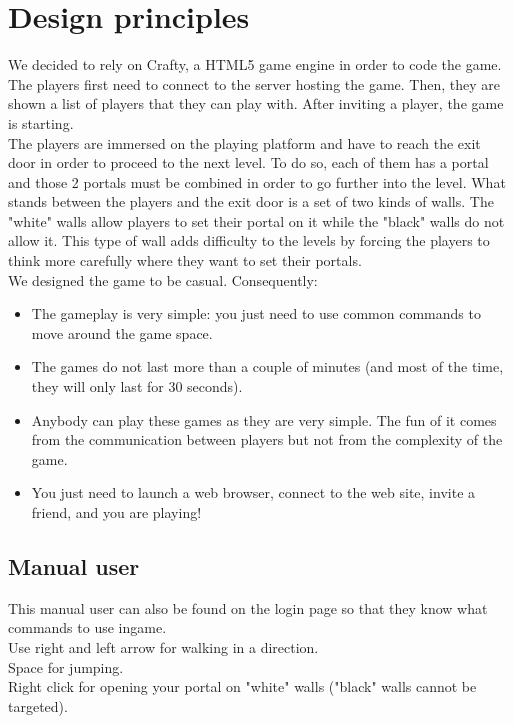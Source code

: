 \documentclass{chi-ext}
\begin{document}
\section{Design principles}
We decided to rely on Crafty, a HTML5 game engine in order to code the game. The players first need to connect to the server hosting the game. Then, they are shown a list of players that they can play with. After inviting a player, the game is starting.\\
The players are immersed on the playing platform and have to reach the exit door in order to proceed to the next level. To do so, each of them has a portal and those 2 portals must be combined in order to go further into the level. What stands between the players and the exit door is a set of two kinds of walls. The "white" walls allow players to set their portal on it while the "black" walls do not allow it. This type of wall adds difficulty to the levels by forcing the players to think more carefully where they want to set their portals.\\
We designed the game to be casual. Consequently:\\
\begin{itemize}
\item The gameplay is very simple: you just need to use common commands to move around the game space.
\item The games do not last more than a couple of minutes (and most of the time, they will only last for 30 seconds).
\item Anybody can play these games as they are very simple. The fun of it comes from the communication between players but not from the complexity of the game.
\item You just need to launch a web browser, connect to the web site, invite a friend, and you are playing!
\end{itemize}

\subsection{Manual user}
This manual user can also be found on the login page so that they know what commands to use ingame.\\

Use right and left arrow for walking in a direction.\\
Space for jumping.\\
Right click for opening your portal on "white" walls ("black" walls cannot be targeted).
\end{document}
